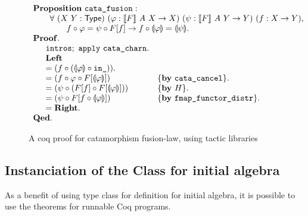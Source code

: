\documentclass[runningheads, orivec]{llncs}
\begin{document}
\begin{figure}[t]
\[
\begin{array}{l}
\mathbf{Proposition}~\verb~cata_fusion~ : \\
\qquad \forall ~ (X~Y : \mathsf{Type}) ~ (\varphi : \llbracket F \rrbracket ~ A ~ X \to X) ~ (\psi : \llbracket F \rrbracket ~ A ~ Y \to Y) ~ (f : X \to Y ), \\
\qquad\qquad f \circ \varphi = \psi \circ F[f] \to f \circ \llparenthesis \varphi \rrparenthesis = \llparenthesis \psi \rrparenthesis.\\
\mathbf{Proof}.\\
\quad \begin{array}[t]{ll}
\verb~intros~; ~ \verb~apply~ ~\verb~cata_charn~. \\
\mathbf{Left} \\
= (f \circ ( \llparenthesis \varphi \rrparenthesis \circ \verb~in_~ )). \\
= ( f \circ \varphi \circ F[\llparenthesis \varphi \rrparenthesis ] ) & \{ \mathbf{by} ~ \verb~cata_cancel~ \}. \\
= ( \psi \circ (F[f] \circ F[\llparenthesis \varphi \rrparenthesis ])) & \{ \mathbf{by} ~ H \}. \\
= ( \psi \circ F[f \circ \llparenthesis \varphi \rrparenthesis ] ) & \{ \mathbf{by} ~ \verb~fmap_functor_distr~ \}. \\
= \mathbf{Right}.\\
\end{array}\\
\mathbf{Qed}.
\end{array}
\]

\caption{A coq proof for catamorphism fusion-law, using tactic libraries}
\label{fig:proof_catamorphism}
\end{figure}


\subsection{Instanciation of the Class for initial algebra}

As a benefit of using type class for definition for initial algebra, it is possible to use the theorems for runnable Coq programs. 
\end{document}
